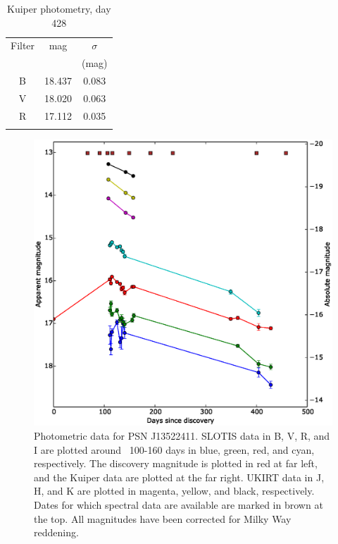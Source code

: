 \documentclass[iop]{emulateapj}
\begin{document}
\begin{table}\begin{center}\begin{minipage}{3.25in}
      \caption{Kuiper photometry, day 428}
\centering
\scriptsize
\tighten
\begin{tabular}{@{}ccc}\hline\hline
Filter &mag &$\sigma$ \\ 
 & &(mag) \\
\hline
B &18.437 &0.083 \\
V &18.020 &0.063 \\
R &17.112 &0.035 \\
\hline \\
\end{tabular}
\label{tab:kuiper}
\end{minipage}\end{center}
\end{table}

\begin{figure}
  \includegraphics[width=\linewidth]{graphics/multi_full_spectra.eps}
  \caption{Photometric data for PSN J13522411. SLOTIS data in B, V, R, and I are plotted around ~100-160 days in blue, green, red, and cyan, respectively. The discovery magnitude is plotted in red at far left, and the Kuiper data are plotted at the far right. UKIRT data in J, H, and K are plotted in magenta, yellow, and black, respectively. Dates for which spectral data are available are marked in brown at the top. All magnitudes have been corrected for Milky Way reddening.}
  \label{fig:curve}
\end{figure}
\end{document}
